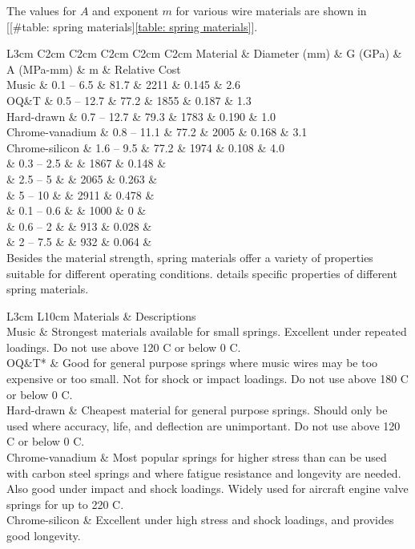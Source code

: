\documentclass[a4paper,openany,12pt]{book}
\begin{document}
{{The values for \(A\) and exponent \(m\) for various wire materials are shown
in [[\#table: spring materials]\ref{table: spring materials}].


 L3cm C2cm C2cm C2cm C2cm C2cm Material \& Diameter (mm) \& G (GPa) \& A
(MPa-mm) \& m \& Relative Cost\\
Music \& 0.1 -- 6.5 \& 81.7 \& 2211 \& 0.145 \& 2.6\\
OQ\&T \& 0.5 -- 12.7 \& 77.2 \& 1855 \& 0.187 \& 1.3\\
Hard-drawn \& 0.7 -- 12.7 \& 79.3 \& 1783 \& 0.190 \& 1.0\\
Chrome-vanadium \& 0.8 -- 11.1 \& 77.2 \& 2005 \& 0.168 \& 3.1\\
Chrome-silicon \& 1.6 -- 9.5 \& 77.2 \& 1974 \& 0.108 \& 4.0\\
\& 0.3 -- 2.5 \& \& 1867 \& 0.148 \&\\
\& 2.5 -- 5 \& \& 2065 \& 0.263 \&\\
\& 5 -- 10 \& \& 2911 \& 0.478 \&\\
\& 0.1 -- 0.6 \& \& 1000 \& 0 \&\\
\& 0.6 -- 2 \& \& 913 \& 0.028 \&\\
\& 2 -- 7.5 \& \& 932 \& 0.064 \&\\

Besides the material strength, spring materials offer a variety of
properties suitable for different operating conditions. details specific
properties of different spring materials.


 L3cm L10cm Materials \& Descriptions\\
Music \& Strongest materials available for small springs. Excellent under
repeated loadings. Do not use above 120 C or below 0 C.\\
OQ\&T* \& Good for general purpose springs where music wires may be too
expensive or too small. Not for shock or impact loadings. Do not use
above 180 C or below 0 C.\\
Hard-drawn \& Cheapest material for general purpose springs. Should only
be used where accuracy, life, and deflection are unimportant. Do not use
above 120 C or below 0 C.\\
Chrome-vanadium \& Most popular springs for higher stress than can be
used with carbon steel springs and where fatigue resistance and
longevity are needed. Also good under impact and shock loadings. Widely
used for aircraft engine valve springs for up to 220 C.\\
Chrome-silicon \& Excellent under high stress and shock loadings, and
provides good longevity.\\

}}
\end{document}
